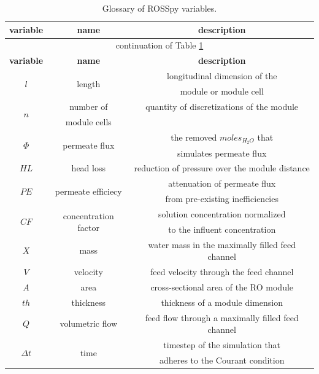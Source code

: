 \documentclass[fleqn,10pt]{wlscirep}
\begin{document}
\begin{longtable}{c|c|c}
    \caption{
        Glossary of ROSSpy variables.  
        \label{glossary} 
    } \\ \toprule
    
    \textbf{variable} & \textbf{name} & \textbf{description} \\ \toprule
    \endfirsthead
    \multicolumn{3}{c}{continuation of Table \ref{glossary}} \\  \toprule
    \textbf{variable} & \textbf{name} & \textbf{description} \\ \toprule
    \endhead
    
    \multirow{2}{1.5em}{$l$} & \multirow{2}{3em}{length} & longitudinal dimension of the\\& & module or module cell \\ \midrule
    \multirow{2}{1.5em}{$n$} & number of & quantity of discretizations of the module \\ & module cells & \\ \midrule
    \multirow{2}{1.5em}{$\Phi$} & \multirow{2}{3em}{permeate flux} & the removed $moles_{H_2O}$ that \\& & simulates permeate flux \\ \midrule  
    $HL$ & head loss & reduction of pressure over the module distance \\ \midrule
    \multirow{2}{2em}{$PE$} & \multirow{2}{3em}{permeate efficiecy} & attenuation of permeate flux \\& & from pre-existing inefficiencies \\ \midrule  
    \multirow{2}{2em}{$CF$} & \multirow{2}{3em}{concentration factor} & solution concentration normalized \\& & to the influent concentration \\ \midrule
    $X$ & mass & water mass in the maximally filled feed channel \\ \midrule
    $V$ & velocity & feed velocity through the feed channel \\ \midrule
    $A$ & area & cross-sectional area of the RO module \\ \midrule
    $th$ & thickness & thickness of a module dimension \\ \midrule
    $Q$ & volumetric flow & feed flow through a maximally filled feed channel \\ \midrule
    \multirow{2}{1.5em}{$\Delta t$} & \multirow{2}{3em}{time} & timestep of the simulation that \\& & adheres to the Courant condition \\ \midrule

\end{longtable}
\end{document}
